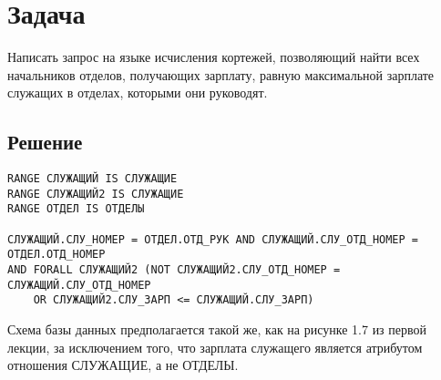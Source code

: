 \documentclass[11pt]{article}
\begin{document}
\section{Задача}
\label{sec:orga1c16fa}
Написать запрос на языке исчисления кортежей, позволяющий найти всех начальников отделов, получающих зарплату, равную максимальной зарплате служащих в отделах, которыми они руководят.
\subsection{Решение}
\label{sec:orga46c9d6}
\begin{verbatim}
RANGE СЛУЖАЩИЙ IS СЛУЖАЩИЕ
RANGE СЛУЖАЩИЙ2 IS СЛУЖАЩИЕ
RANGE ОТДЕЛ IS ОТДЕЛЫ

СЛУЖАЩИЙ.СЛУ_НОМЕР = ОТДЕЛ.ОТД_РУК AND СЛУЖАЩИЙ.СЛУ_ОТД_НОМЕР = ОТДЕЛ.ОТД_НОМЕР
AND FORALL СЛУЖАЩИЙ2 (NOT СЛУЖАЩИЙ2.СЛУ_ОТД_НОМЕР = СЛУЖАЩИЙ.СЛУ_ОТД_НОМЕР
    OR СЛУЖАЩИЙ2.СЛУ_ЗАРП <= СЛУЖАЩИЙ.СЛУ_ЗАРП)
\end{verbatim}
Схема базы данных предполагается такой же, как на рисунке 1.7 из первой лекции, за исключением того, что зарплата служащего является атрибутом отношения СЛУЖАЩИЕ, а не ОТДЕЛЫ.
\pagebreak
\end{document}
